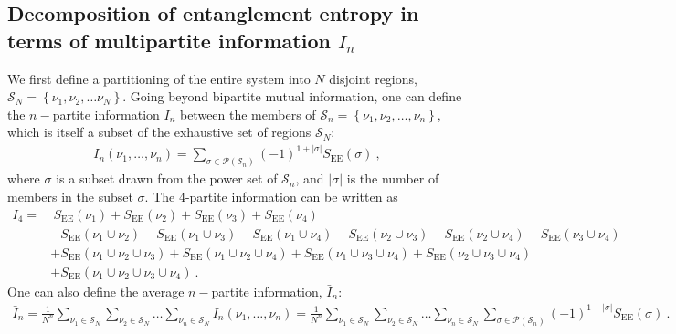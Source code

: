 \documentclass[reprint,hidelinks,onecolumn]{revtex4-2}
\begin{document}
\subsection{Decomposition of entanglement entropy in terms of multipartite information \(I_n\)}
We first define a partitioning of the entire system into \(N\) disjoint regions, \(\mathcal{S}_N = \left\{ \nu_1, \nu_2,\ldots\nu_N\right\} \). Going beyond bipartite mutual information, one can define the \(n-\)partite information \(I_n\) between the members of \(\mathcal{S}_n = \left\{\nu_1,\nu_2,\ldots,\nu_n\right\} \), which is itself a subset of the exhaustive set of regions \(\mathcal{S}_N\):
\begin{equation}\begin{aligned}
	I_n(\nu_1,\ldots,\nu_n) = \sum_{\sigma \in \mathcal{P}\left(\mathcal{S}_n\right)} (-1)^{1 + |\sigma|} S_\text{EE}(\sigma)~,
\end{aligned}\end{equation}
where \(\sigma\) is a subset drawn from the power set of \(\mathcal{S}_n\), and \(|\sigma|\) is the number of members in the subset \(\sigma\). The 4-partite information can be written as
\begin{equation}\begin{aligned}
	I_4 = & ~ S_\text{EE}(\nu_1) + S_\text{EE}(\nu_2) + S_\text{EE}(\nu_3) + S_\text{EE}(\nu_4) \\
		  & - S_\text{EE}(\nu_1 \cup \nu_2) - S_\text{EE}(\nu_1 \cup \nu_3) - S_\text{EE}(\nu_1 \cup \nu_4) - S_\text{EE}(\nu_2 \cup \nu_3) - S_\text{EE}(\nu_2 \cup \nu_4) - S_\text{EE}(\nu_3 \cup \nu_4) \\
		  & + S_\text{EE}(\nu_1 \cup \nu_2 \cup \nu_3) + S_\text{EE}(\nu_1 \cup \nu_2 \cup \nu_4) + S_\text{EE}(\nu_1 \cup \nu_3 \cup \nu_4) + S_\text{EE}(\nu_2 \cup \nu_3 \cup \nu_4)\\
		  & + S_\text{EE}(\nu_1 \cup \nu_2 \cup \nu_3 \cup \nu_4)~.
\end{aligned}\end{equation}
One can also define the average \(n-\)partite information, \(\bar I_n\):
\begin{equation}\begin{aligned}
\bar I_n = \frac{1}{N^n}\sum_{\nu_1 \in \mathcal{S}_N} \sum_{\nu_2 \in \mathcal{S}_N}\ldots\sum_{\nu_n \in \mathcal{S}_N} I_n(\nu_1,\ldots,\nu_n) = \frac{1}{N^n}\sum_{\nu_1 \in \mathcal{S}_N} \sum_{\nu_2 \in \mathcal{S}_N}\ldots\sum_{\nu_n \in \mathcal{S}_N}\sum_{\sigma \in \mathcal{P}\left(\mathcal{S}_n\right)} (-1)^{1 + |\sigma|} S_\text{EE}(\sigma)~.
\end{aligned}\end{equation}
\end{document}

